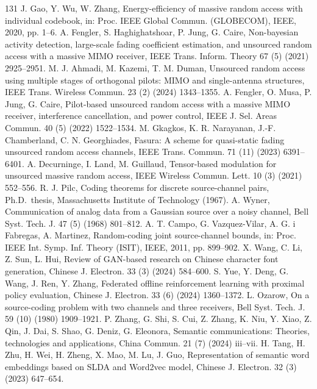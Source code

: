 \begin{thebibliography}{131}
 J. Gao, Y. Wu, W. Zhang, Energy-efficiency of massive random access with individual codebook, in: Proc. IEEE Global Commun. (GLOBECOM), IEEE, 2020, pp. 1--6.
 A. Fengler, S. Haghighatshoar, P. Jung, G. Caire, Non-bayesian activity detection, large-scale fading coefficient estimation, and unsourced random access with a massive MIMO receiver, IEEE Trans. Inform. Theory 67 (5) (2021) 2925--2951.
 M. J. Ahmadi, M. Kazemi, T. M. Duman, Unsourced random access using multiple stages of orthogonal pilots: MIMO and single-antenna structures, IEEE Trans. Wireless Commun. 23 (2) (2024) 1343--1355.
 A. Fengler, O. Musa, P. Jung, G. Caire, Pilot-based unsourced random access with a massive MIMO receiver, interference cancellation, and power control, IEEE J. Sel. Areas Commun. 40 (5) (2022) 1522--1534.
 M. Gkagkos, K. R. Narayanan, J.-F. Chamberland, C. N. Georghiades, Fasura: A scheme for quasi-static fading unsourced random access channels, IEEE Trans. Commun. 71 (11) (2023) 6391--6401.
 A. Decurninge, I. Land, M. Guillaud, Tensor-based modulation for unsourced massive random access, IEEE Wireless Commun. Lett. 10 (3) (2021) 552--556.
 R. J. Pilc, Coding theorems for discrete source-channel pairs, Ph.D.\ thesis, Massachusetts Institute of Technology (1967).
 A. Wyner, Communication of analog data from a Gaussian source over a noisy channel, Bell Syst. Tech. J. 47 (5) (1968) 801--812.
 A. T. Campo, G. Vazquez-Vilar, A. G. i Fabregas, A. Martinez, Random-coding joint source-channel bounds, in: Proc. IEEE Int. Symp. Inf. Theory (ISIT), IEEE, 2011, pp. 899--902.
 X. Wang, C. Li, Z. Sun, L. Hui, Review of GAN-based research on Chinese character font generation, Chinese J. Electron. 33 (3) (2024) 584--600.
 S. Yue, Y. Deng, G. Wang, J. Ren, Y. Zhang, Federated oﬄine reinforcement learning with proximal policy evaluation, Chinese J. Electron. 33 (6) (2024) 1360--1372.
 L. Ozarow, On a source-coding problem with two channels and three receivers, Bell Syst. Tech. J. 59 (10) (1980) 1909--1921.
 P. Zhang, G. Shi, S. Cui, Z. Zhang, K. Niu, Y. Xiao, Z. Qin, J. Dai, S. Shao, G. Deniz, G. Eleonora, Semantic communications: Theories, technologies and applications, China Commun. 21 (7) (2024) iii--vii.
 H. Tang, H. Zhu, H. Wei, H. Zheng, X. Mao, M. Lu, J. Guo, Representation of semantic word embeddings based on SLDA and Word2vec model, Chinese J. Electron. 32 (3) (2023) 647--654.
\end{thebibliography}

